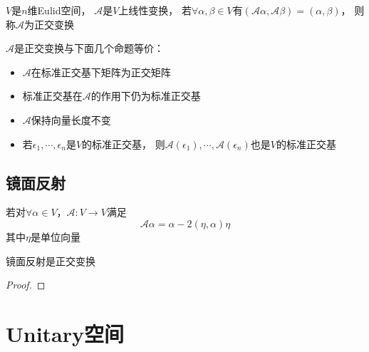 \begin{definition}[正交变换]
  $V$是$n$维Eulid空间，
  $\mathcal{A}$是$V$上线性变换，
  若$\forall \alpha, \beta \in V$有$(\mathcal{A} \alpha, \mathcal{A} \beta) = (\alpha, \beta)$，
  则称$\mathcal{A}$为正交变换
\end{definition}

\begin{theorem}[正交变换充要条件]
  $\mathcal{A}$是正交变换与下面几个命题等价：
  \begin{itemize}
  \item $\mathcal{A}$在标准正交基下矩阵为正交矩阵
  \item 标准正交基在$\mathcal{A}$的作用下仍为标准正交基
  \item $\mathcal{A}$保持向量长度不变
  \item 若$\epsilon_1,\cdots,\epsilon_n$是$V$的标准正交基，
    则$\mathcal{A}(\epsilon_1),\cdots,\mathcal{A}(\epsilon_n)$也是$V$的标准正交基
  \end{itemize}
\end{theorem}


\subsection{镜面反射}

\begin{definition}[镜面反射]
  若对$\forall \alpha \in V$，$\mathcal{A}:V \rightarrow V$满足
  \begin{equation*}
    \mathcal{A} \alpha = \alpha - 2(\eta, \alpha)\eta
  \end{equation*}
  其中$\eta$是单位向量
\end{definition}

\begin{lemma}[镜面反射是正交变换]
  镜面反射是正交变换
\end{lemma}

\begin{proof}
  
\end{proof}

\begin{theorem}[镜面反射的特征]
  
\end{theorem}





\section{Unitary空间}

